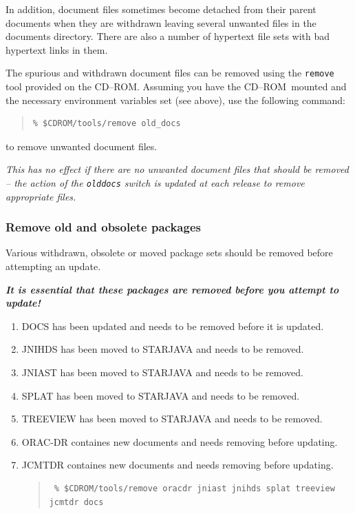 \documentclass[twoside,11pt]{article}
\renewcommand{\_}{\texttt{\symbol{95}}}
\newcommand{\cdrom}{CD--ROM}
\newcommand{\cdrom}{CD-ROM}
\begin{document}
In addition, document files sometimes become detached from their
parent documents when they are withdrawn leaving several unwanted
files in the documents directory.  There are also a number of hypertext
file sets with bad hypertext links in them.

The spurious and withdrawn document files can be removed using the
\texttt{remove} tool provided on the \cdrom.  Assuming you have the
\cdrom\ mounted and the necessary environment variables set (see above),
use the following command:

\begin{quote}
\begin{verbatim}
% $CDROM/tools/remove old_docs
\end{verbatim}
\end{quote}

to remove unwanted document files.

\textit{This has no effect if there are no unwanted document files
that should be removed -- the action of the \texttt{old\_docs} switch is
updated at each release to remove appropriate files.}

\subsubsection{Remove old and obsolete packages}


 Various withdrawn, obsolete or moved package sets should be removed before
 attempting an update.

 \textit{\textbf{It is essential that these packages are removed
 before you attempt to update!}}

 \begin{enumerate}

 \item DOCS has been updated and needs to be removed before it is updated.

 \item JNIHDS has been moved to STARJAVA and needs to be removed.

 \item JNIAST has been moved to STARJAVA and needs to be removed.

 \item SPLAT has been moved to STARJAVA and needs to be removed.

 \item TREEVIEW has been moved to STARJAVA and needs to be removed.

 \item ORAC-DR containes new documents and needs removing before updating.

 \item JCMTDR containes new documents and needs removing before updating.

 \begin{quote}
 \begin{verbatim}
 % $CDROM/tools/remove oracdr jniast jnihds splat treeview jcmtdr docs
 \end{verbatim}
 \end{quote}

 \end{enumerate}
\end{document}
